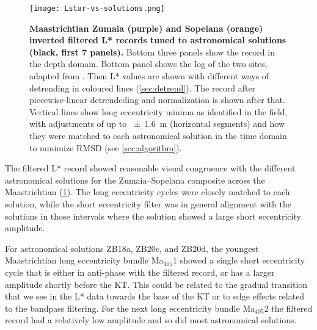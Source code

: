 \documentclass[draft]{agujournal2019}
\newcommand{\ma}[1]{Ma\(_{405}\)#1} %
\begin{document}
\begin{figure}
  \centering
  \texttt{[image: Lstar-vs-solutions.png]}
  \caption{\label{fig:rolling-depth-age}
    \textbf{Maastrichtian Zumaia (purple) and Sopelana (orange) inverted filtered \gls{L*} records tuned to astronomical solutions (black, first 7 panels).}
    Bottom three panels show the record in the depth domain.
    Bottom panel shows the log of the two sites, adapted from .
    Then \gls{L*} values are shown with different ways of detrending in coloured lines (\cref{sec:detrend}).
    The record after piecewise-linear detrendeding and normalization is shown after that.
    Vertical lines show long eccentricity minima as identified in the field,
    with adjustments of up to \qty{\pm1.6}{\metre} (horizontal segments)
    and how they were matched to each astronomical solution in the time domain to minimize \gls{RMSD} (see \cref{sec:algorithm}).
    }
\end{figure}



The filtered \gls{L*} record showed reasonable visual congruence with the different astronomical solutions for the Zumaia--Sopelana composite across the Maastrichtian (\cref{fig:rolling-depth-age}). %
The long eccentricity cycles were closely matched to each solution, while the short eccentricity filter was in general alignment with the solutions in those intervals where the solution showed a large short eccentricity amplitude.

For astronomical solutions ZB18a, ZB20c, and ZB20d, the youngest Maastrichtian long eccentricity bundle \ma{1} showed a single short eccentricity cycle that is either in anti-phase with the filtered record, or has a larger amplitude shortly before the \gls{KT}.
This could be related to the gradual transition that we see in the \gls{L*} data towards the base of the \gls{KT} or to edge effects related to the bandpass filtering.
For the next long eccentricity bundle \ma{2} the filtered record had a relatively low amplitude and so did most astronomical solutions.
\end{document}
